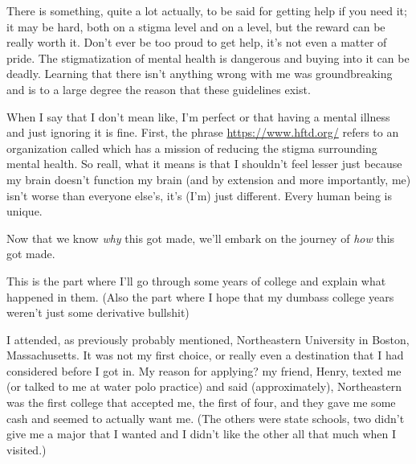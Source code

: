 \documentclass[./butidigress.tex]{subfiles}
\begin{document}
There is something, quite a lot actually, to be said for getting help if you need it; it may be hard, both on a stigma level and on a  level, but the reward can be really worth it.
Don't ever be too proud to get help, it's not even a matter of pride.
The stigmatization of mental health is dangerous and buying into it can be deadly.
Learning that there isn't anything wrong with me was groundbreaking and is to a large degree the reason that these guidelines exist.

When I say that  I don't mean like, I'm perfect or that having a mental illness and just ignoring it is fine.
First, the phrase \href{it's okay not to be okay}{https://www.hftd.org/} refers to an organization called  which has a mission of reducing the stigma surrounding mental health.
So reall, what it means is that I shouldn't feel lesser just because my brain doesn't function  my brain (and by extension and more importantly, me) isn't worse than everyone else's, it's (I'm) just different.
Every human being is unique.

Now that we know \emph{why} this got made, we'll embark on the journey of \emph{how} this got made.

\label{subsec:narrative}
This is the part where I'll go through some years of college and explain what happened in them.
(Also the part where I hope that my dumbass college years weren't just some derivative bullshit)

I attended, as previously probably mentioned, Northeastern University in Boston, Massachusetts.
It was not my first choice, or really even a destination that I had considered before I got in.
My reason for applying? my friend, Henry, texted me (or talked to me at water polo practice) and said (approximately), 
Northeastern was the first college that accepted me, the first of four, and they gave me some cash and seemed to actually want me.
(The others were state schools, two didn't give me a major that I wanted and I didn't like the other all that much when I visited.)
\end{document}
